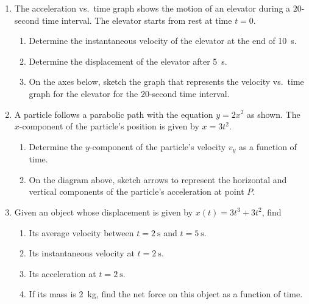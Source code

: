 \documentclass{../../oss-apphys}
\begin{document}
\begin{enumerate}[leftmargin=15pt]

\item The acceleration vs.\ time graph shows the motion of an elevator during a
  $20$-second time interval. The elevator starts from rest at time $t=0$. 
  \begin{center}
  \end{center}
  \begin{enumerate}[noitemsep]
  \item Determine the instantaneous velocity of the elevator at the end of
    \SI{10}{\second}.
    \vspace{1in}
  \item Determine the displacement of the elevator after \SI{5}{\second}.
    \vspace{1in}
  \item On the axes below, sketch the graph that represents the velocity vs.\
    time graph for the elevator for the $20$-second time interval.
    \begin{center}
    \end{center}
    \newpage
  \end{enumerate}
  
\item A particle follows a parabolic path with the equation $y=2x^2$ as shown.
  The $x$-component of the particle's position is given by $x=3t^2$.
  \begin{center}
  \end{center}
  \begin{enumerate}[noitemsep]
  \item Determine the $y$-component of the particle's velocity $v_y$ as a
    function of time.
  \item On the diagram above, sketch arrows to represent the horizontal and
    vertical components of the particle's acceleration at point $P$.
  \end{enumerate}

\item Given an object whose displacement is given by $x(t)=3t^3+3t^2$, find
  \begin{enumerate}[noitemsep,topsep=0pt]
  \item Its average velocity between $t=\SI{2}{\s}$ and $t=\SI{5}{\s}$.
  \item Its instantaneous velocity at $t=\SI{2}{\s}$.
  \item Its acceleration at $t=\SI{2}{\s}$.
  \item If its mass is \SI{2}{\kg}, find the net force on this object as a
    function of time.
  \end{enumerate}
  \newpage


\end{enumerate}
\end{document}
